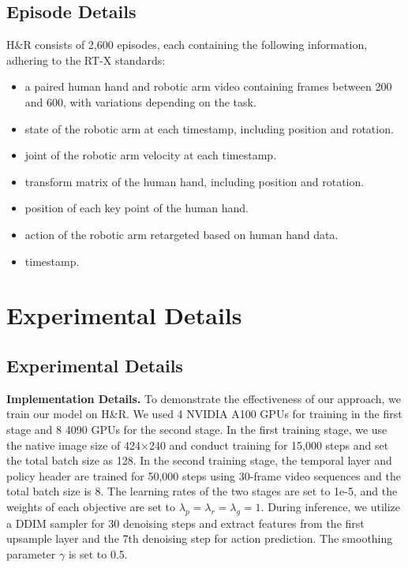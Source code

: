 \subsection{Episode Details}
H\&R consists of 2,600 episodes, each containing the following information, adhering to the RT-X standards:
\begin{itemize}
    \item a paired human hand and robotic arm video containing frames between 200 and 600, with variations depending on the task.
    \item state of the robotic arm at each timestamp, including position and rotation.
    \item joint of the robotic arm velocity at each timestamp.
    \item transform matrix of the human hand, including position and rotation.
    \item position of each key point of the human hand.
    \item action of the robotic arm retargeted based on human hand data.
    \item timestamp.
\end{itemize}


\section{Experimental Details}
\subsection{Experimental Details}
\noindent\textbf{Implementation Details.} 
To demonstrate the effectiveness of our approach, we train our model on H\&R. We used 4 NVIDIA A100 GPUs for training in the first stage and 8 4090 GPUs for the second stage. In the first training stage, we use the native image size of 424×240 and conduct training for 15,000 steps and set the total batch size as 128. In the second training stage, the temporal layer and policy header are trained for 50,000 steps using 30-frame video sequences and the total batch size is 8. The learning rates of the two stages are set to 1e-5, and the weights of each objective are set to $\lambda_p = \lambda_r = \lambda_g = 1$. During inference, we utilize a DDIM sampler for 30 denoising steps and extract features from the first upsample layer and the 7th denoising step for action prediction. The smoothing parameter $\gamma$ is set to 0.5.


